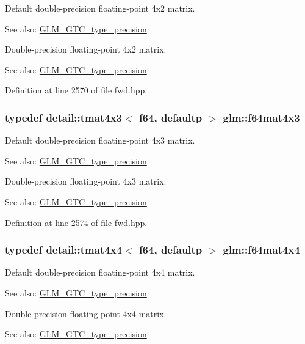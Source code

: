 Default double-precision floating-point 4x2 matrix. \begin{Desc}
\item[See also:]\hyperlink{group__gtc__type__precision}{GLM\_\-GTC\_\-type\_\-precision}\end{Desc}
Double-precision floating-point 4x2 matrix. \begin{Desc}
\item[See also:]\hyperlink{group__gtc__type__precision}{GLM\_\-GTC\_\-type\_\-precision} \end{Desc}


Definition at line 2570 of file fwd.hpp.\hypertarget{group__gtc__type__precision_gca283f88500d9895afb939516e7372d1}{
\subsubsection[f64mat4x3]{\setlength{\rightskip}{0pt plus 5cm}typedef detail::tmat4x3$<$ f64, defaultp $>$ {\bf glm::f64mat4x3}}}
\label{group__gtc__type__precision_gca283f88500d9895afb939516e7372d1}


Default double-precision floating-point 4x3 matrix. \begin{Desc}
\item[See also:]\hyperlink{group__gtc__type__precision}{GLM\_\-GTC\_\-type\_\-precision}\end{Desc}
Double-precision floating-point 4x3 matrix. \begin{Desc}
\item[See also:]\hyperlink{group__gtc__type__precision}{GLM\_\-GTC\_\-type\_\-precision} \end{Desc}


Definition at line 2574 of file fwd.hpp.\hypertarget{group__gtc__type__precision_g37a1ae1f6e67b5a6a06b1ee7c83f4bec}{
\subsubsection[f64mat4x4]{\setlength{\rightskip}{0pt plus 5cm}typedef detail::tmat4x4$<$ f64, defaultp $>$ {\bf glm::f64mat4x4}}}
\label{group__gtc__type__precision_g37a1ae1f6e67b5a6a06b1ee7c83f4bec}


Default double-precision floating-point 4x4 matrix. \begin{Desc}
\item[See also:]\hyperlink{group__gtc__type__precision}{GLM\_\-GTC\_\-type\_\-precision}\end{Desc}
Double-precision floating-point 4x4 matrix. \begin{Desc}
\item[See also:]\hyperlink{group__gtc__type__precision}{GLM\_\-GTC\_\-type\_\-precision} \end{Desc}


